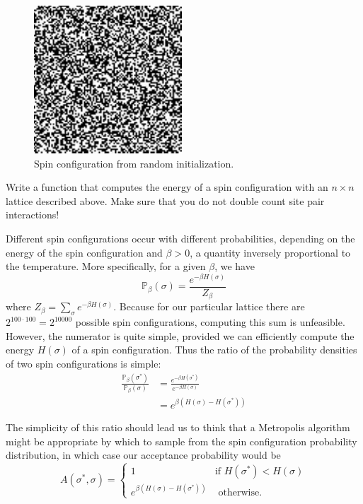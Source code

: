 \begin{figure}
\centering
\includegraphics[width=.5\textwidth]{init.pdf}
\caption{Spin configuration from random initialization.}
\label{fig:random_spin}
\end{figure}

\begin{problem}
Write a function that computes the energy of a spin configuration with an $n \times n$ lattice described above. Make sure that you do not double count site pair interactions!
\end{problem}

Different spin configurations occur with different probabilities, depending on the energy of the spin configuration and $\beta > 0$, a quantity inversely proportional to the temperature. More specifically, for a given $\beta$, we have
\begin{equation*}
\mathbb{P}_{\beta}(\sigma) = \frac{e^{-\beta H(\sigma)}}{Z_{\beta}}
\end{equation*}
where $Z_{\beta} = \sum_{\sigma} e^{-\beta H(\sigma)}$. Because for our particular lattice there are $2^{100 \cdot 100} = 2^{10000}$ possible spin configurations, computing this sum is unfeasible. However, the numerator is quite simple, provided we can efficiently compute the energy $H(\sigma)$ of a spin configuration. Thus the ratio of the probability densities of two spin configurations is simple:
\begin{align*}
\frac{\mathbb{P}_{\beta}(\sigma^{*})}{\mathbb{P}_{\beta}(\sigma)} & = \frac{e^{-\beta H(\sigma^{*})}}{e^{-\beta H(\sigma)}} \\
& = e^{\beta (H(\sigma) - H(\sigma^{*}))}
\end{align*}

The simplicity of this ratio should lead us to think that a Metropolis algorithm might be appropriate by which to sample from the spin configuration probability distribution, in which case our acceptance probability would be
\begin{equation*}
A(\sigma^{*}, \sigma) = \begin{cases} 1 & \mbox{if } H(\sigma^{*}) < H(\sigma) \\ e^{\beta (H(\sigma) - H(\sigma^{*}))} & \mbox{ otherwise.} \end{cases}
\end{equation*}

